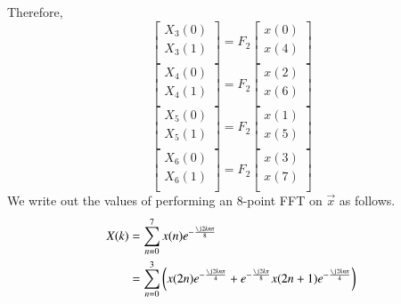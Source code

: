 \documentclass[journal,12pt,twocolumn]{IEEEtran}
\renewcommand\thesection{\arabic{section}}
\begin{document}
\begin{enumerate}[label=\thesection.\arabic*
	,ref=\thesection.\theenumi]
\begin{enumerate}[label=\arabic*.,ref=\thesection.\theenumi]
\begin{equation}
	\end{equation}
	Therefore,
	\begin{equation}
		\begin{bmatrix}
			X_{3}(0) \\ 
			X_{3}(1)\\ 
		\end{bmatrix}
		= F_{2}
		\begin{bmatrix}
			x(0) \\ 
			x(4) \\ 
		\end{bmatrix}
	\end{equation}
	\begin{equation}
		\begin{bmatrix}
			X_{4}(0) \\ 
			X_{4}(1)\\ 
		\end{bmatrix}
		= F_{2}
		\begin{bmatrix}
			x(2) \\ 
			x(6) \\ 
		\end{bmatrix}
	\end{equation}
	\begin{equation}
		\begin{bmatrix}
			X_{5}(0) \\ 
			X_{5}(1)\\ 
		\end{bmatrix}
		= F_{2}
		\begin{bmatrix}
			x(1) \\ 
			x(5) \\ 
		\end{bmatrix}
	\end{equation}
	\begin{equation}
		\begin{bmatrix}
			X_{6}(0) \\ 
			X_{6}(1)\\ 
		\end{bmatrix}
		= F_{2}
		\begin{bmatrix}
			x(3) \\ 
			x(7) \\ 
		\end{bmatrix}
	\end{equation}
\solution We write out the values of performing an 8-point FFT on $\vec{x}$ as follows.
\begin{align}
	X(k) &= \sum_{n = 0}^{7}x(n)e^{-\frac{\j2kn\pi}{8}} \\
	&= \sum_{n = 0}^{3}\brak{x(2n)e^{-\frac{\j2kn\pi}{4}} + e^{-\frac{\j2k\pi}{8}}x(2n + 1)e^{-\frac{\j2kn\pi}{4}}} \\

\end{align}
\end{enumerate}
\end{enumerate}
\end{document}
